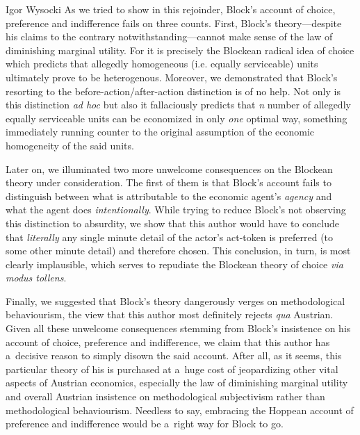 \begin{artengenv}{Igor Wysocki}
As we tried to show in this rejoinder, Block's account of choice, preference and indifference fails on three counts. First, Block's theory---despite his claims to the contrary notwithstanding---cannot make sense of the law of diminishing marginal utility. For it is precisely the Blockean radical idea of choice which predicts that allegedly homogeneous (i.e. equally serviceable) units ultimately prove to be heterogenous. Moreover, we demonstrated that Block's resorting to the before-action/after-action distinction is of no help. Not only is this distinction \textit{ad hoc} but also it fallaciously predicts that \textit{n} number of allegedly equally serviceable units can be economized in only \textit{one} optimal way, something immediately running counter to the original assumption of the economic homogeneity of the said units.



Later on, we illuminated two more unwelcome consequences on the Blockean theory under consideration. The first of them is that Block's 
\parencite*[][]{block_response_2022} %
 account fails to distinguish between what is attributable to the economic agent's \textit{agency} and what the agent does \textit{intentionally}. While trying to reduce Block's not observing this distinction to absurdity, we show that this author would have to conclude that \textit{literally} any single minute detail of the actor's act-token is preferred (to some other minute detail) and therefore chosen. This conclusion, in turn, is most clearly implausible, which serves to repudiate the Blockean theory of choice \textit{via modus tollens}.



Finally, we suggested that Block's theory dangerously verges on methodological behaviourism, the view that this author most definitely rejects \textit{qua} Austrian. Given all these unwelcome consequences stemming from Block's insistence on his account of choice, preference and indifference, we claim that this author has a~decisive reason to simply disown the said account. After all, as it seems, this particular theory of his is purchased at a~huge cost of jeopardizing other vital aspects of Austrian economics, especially the law of diminishing marginal utility and overall Austrian insistence on methodological subjectivism rather than methodological behaviourism. Needless to say, embracing the Hoppean 
\parencite*[][]{hoppe_must_2005} %
 account of preference and indifference would be a~right way for Block to go.





\end{artengenv}\label{wysocki-rejoinder-lastpage}

